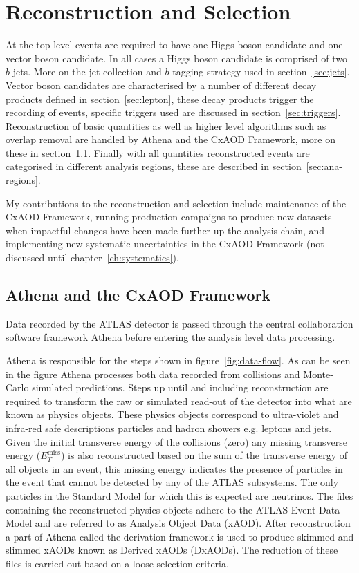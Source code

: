 \chapter{Reconstruction and Selection}%
\label{ch:recon}

At the top level events are required to have one Higgs boson candidate and one
vector boson candidate. In all cases a Higgs boson candidate is comprised of two
$b$-jets. More on the jet collection and $b$-tagging strategy used in
section~\ref{sec:jets}. Vector boson candidates are characterised by a number of
different decay products defined in section~\ref{sec:lepton}, these decay
products trigger the recording of events, specific triggers used are discussed
in section~\ref{sec:triggers}. Reconstruction of basic quantities as well as
higher level algorithms such as overlap removal are handled by Athena and the
CxAOD Framework, more on these in section~\ref{sec:cxaod}. Finally with all
quantities reconstructed events are categorised in different analysis regions,
these are described in section~\ref{sec:ana-regions}.

My contributions to the reconstruction and selection include maintenance of the
CxAOD Framework, running production campaigns to produce new datasets when
impactful changes have been made further up the analysis chain, and implementing
new systematic uncertainties in the CxAOD Framework (not discussed until
chapter~\ref{ch:systematics}).

\section{Athena and the CxAOD Framework}
\label{sec:cxaod}
Data recorded by the ATLAS detector is passed through the central collaboration
software framework Athena before entering the analysis level data processing.

Athena is responsible for the steps shown in figure~\ref{fig:data-flow}. As can
be seen in the figure Athena processes both data recorded from collisions and
Monte-Carlo simulated predictions. Steps up until and including reconstruction
are required to transform the raw or simulated read-out of the detector into
what are known as physics objects. These physics objects correspond to
ultra-violet and infra-red safe descriptions particles and hadron showers e.g.
leptons and jets. Given the initial transverse energy of the collisions (zero)
any missing transverse energy ($E_T^{\text{miss}}$) is also reconstructed based
on the sum of the transverse energy of all objects in an event, this missing
energy indicates the presence of particles in the event that cannot be detected
by any of the ATLAS subsystems. The only particles in the Standard Model for
which this is expected are neutrinos. The files containing the reconstructed
physics objects adhere to the ATLAS Event Data Model and are referred to as
Analysis Object Data (xAOD). After reconstruction a part of Athena called the
derivation framework is used to produce skimmed and slimmed xAODs known as
Derived xAODs (DxAODs). The reduction of these files is carried out based on a
loose selection criteria.

